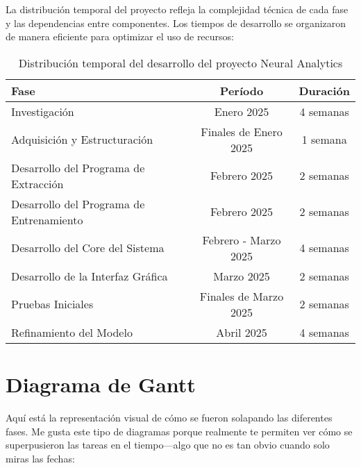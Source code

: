 La distribución temporal del proyecto refleja la complejidad técnica de cada fase y las dependencias entre componentes. Los tiempos de desarrollo se organizaron de manera eficiente para optimizar el uso de recursos:

\begin{table}[ht]
    \centering
    \begin{tabular}{|l|c|c|}
        \hline
        \textbf{Fase} & \textbf{Período} & \textbf{Duración} \\
        \hline
        Investigación & Enero 2025 & 4 semanas \\
        \hline
        Adquisición y Estructuración & Finales de Enero 2025 & 1 semana \\
        \hline
        Desarrollo del Programa de Extracción & Febrero 2025 & 2 semanas \\
        \hline
        Desarrollo del Programa de Entrenamiento & Febrero 2025 & 2 semanas \\
        \hline
        Desarrollo del Core del Sistema & Febrero - Marzo 2025 & 4 semanas \\
        \hline
        Desarrollo de la Interfaz Gráfica & Marzo 2025 & 2 semanas \\
        \hline
        Pruebas Iniciales & Finales de Marzo 2025 & 2 semanas \\
        \hline
        Refinamiento del Modelo & Abril 2025 & 4 semanas \\
        \hline
    \end{tabular}
    \caption{Distribución temporal del desarrollo del proyecto Neural Analytics}
    \label{tab:temporal_distribution}
\end{table}

\newpage
\section{Diagrama de Gantt}

Aquí está la representación visual de cómo se fueron solapando las diferentes fases. Me gusta este tipo de diagramas porque realmente te permiten ver cómo se superpusieron las tareas en el tiempo—algo que no es tan obvio cuando solo miras las fechas:

